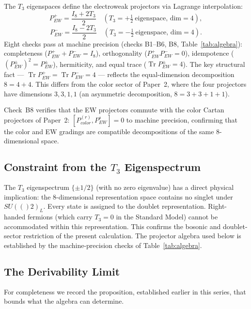 \documentclass[12pt,a4paper]{article}
\newcommand{\SU}{\mathrm{SU}}
\newcommand{\Tr}{\operatorname{Tr}}
\newcommand{\Id}[1]{I_{#1}}
\newcommand{\Pew}[1]{P^{#1}_{\mathrm{EW}}}
\def\SU#1{SU(#1)}%
\def\mathrm#1{#1}%
\begin{document}
	The $T_3$ eigenspaces define the electroweak projectors via Lagrange interpolation:
	\begin{equation}
		\Pew{+} = \frac{\Id{8}+2T_3}{2}\quad(T_3=+{\tfrac{1}{2}}\ \text{eigenspace, dim}=4),
	\end{equation}
	\begin{equation}
		\Pew{-} = \frac{\Id{8}-2T_3}{2}\quad(T_3=-{\tfrac{1}{2}}\ \text{eigenspace, dim}=4).
	\end{equation}
	Eight checks pass at machine precision (checks B1--B6, B8,
	Table~\ref{tab:algebra}): completeness ($\Pew{+}+\Pew{-}=\Id{8}$), orthogonality
	($\Pew{+}\Pew{-}=0$), idempotence ($(\Pew{\pm})^2=\Pew{\pm}$), hermiticity, and
	equal trace ($\Tr\Pew{\pm}=4$).  The key structural fact ---
	$\Tr\Pew{+}=\Tr\Pew{-}=4$ --- reflects the equal-dimension decomposition $8=4+4$.
	This differs from the color sector of Paper~2, where the four projectors have
	dimensions $3,3,1,1$ (an asymmetric decomposition, $8=3+3+1+1$).
	
	Check~B8 verifies that the EW projectors commute with the color Cartan projectors
	of Paper~2: $[P_{\mathrm{color}}^{(r)},\Pew{s}]=0$ to machine precision,
	confirming that the color and EW gradings are compatible decompositions of the
	same 8-dimensional space.
	
	\subsection{Constraint from the \texorpdfstring{$T_3$}{T3} Eigenspectrum}
	
	The $T_3$ eigenspectrum $\{\pm1/2\}$ (with no zero eigenvalue) has a direct
	physical implication: the 8-dimensional representation space contains no singlet
	under $\SU(2)_L$.  Every state is assigned to the doublet representation.
	Right-handed fermions (which carry $T_3=0$ in the Standard Model) cannot be
	accommodated within this representation.  This confirms the bosonic and
	doublet-sector restriction of the present calculation.  The projector algebra used
	below is established by the machine-precision checks of Table~\ref{tab:algebra}.
	

	\subsection{The Derivability Limit}
	
	For completeness we record the proposition, established earlier in this series,
	that bounds what the algebra can determine.
	
\end{document}
